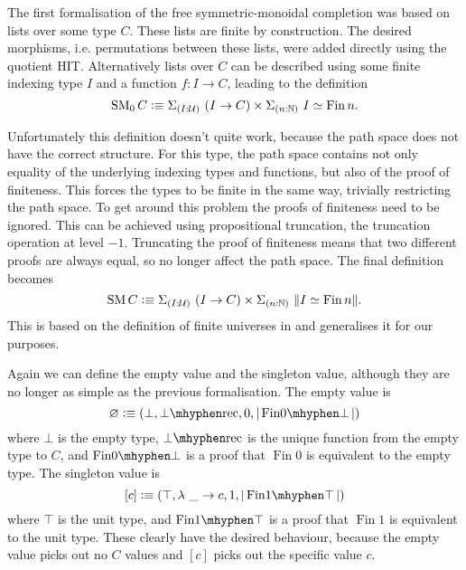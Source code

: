 \documentclass[12pt, parskip, DIV=14]{scrbook}
\newcommand{\defeq}{\vcentcolon\equiv}
\newcommand{\SM}{\operatorname{SM}}
\newcommand{\Fin}{\operatorname{Fin}}
\newcommand{\botrec}{\operatorname{\bot\mhyphen rec}}
\newcommand{\finempty}{\operatorname{Fin0\mhyphen\bot}}
\newcommand{\finunit}{\operatorname{Fin1\mhyphen\top}}
\begin{document}
The first formalisation of the free symmetric-monoidal completion was based on lists over some type $C$. These lists are finite by construction. The desired morphisms, i.e. permutations between these lists, were added directly using the quotient HIT. Alternatively lists over $C$ can be described using some finite indexing type $I$ and a function $f : I \to C$, leading to the definition
$$\SM_0 C \defeq \Sigma_{(I : \mathcal{U})}~(I \to C) \times \Sigma_{(n : \mathbb{N})}~I \simeq \Fin n.$$

Unfortunately this definition doesn't quite work, because the path space does not have the correct structure. For this type, the path space contains not only equality of the underlying indexing types and functions, but also of the proof of finiteness. This forces the types to be finite in the same way, trivially restricting the path space. To get around this problem the proofs of finiteness need to be ignored. This can be achieved using propositional truncation, the truncation operation at level $-1$. Truncating the proof of finiteness means that two different proofs are always equal, so no longer affect the path space. The final definition becomes
$$\SM C \defeq \Sigma_{(I : \mathcal{U})}~(I \to C) \times \Sigma_{(n : \mathbb{N})}~\|I \simeq \Fin n\|.$$ This is based on the definition of finite universes in \citet{yorgey2014combinatorial} and generalises it for our purposes.

Again we can define the empty value and the singleton value, although they are no longer as simple as the previous formalisation. The empty value is
$$\varnothing \defeq (\bot, \botrec, 0, | \finempty |)$$
where $\bot$ is the empty type, $\botrec$ is the unique function from the empty type to $C$, and $\finempty$ is a proof that $\Fin 0$ is equivalent to the empty type. The singleton value is
$$[c] \defeq (\top, \lambda~\_ \to c, 1, | \finunit |)$$
where $\top$ is the unit type, and $\finunit$ is a proof that $\Fin 1$ is equivalent to the unit type. These clearly have the desired behaviour, because the empty value picks out no $C$ values and $[c]$ picks out the specific value $c$.
\end{document}

